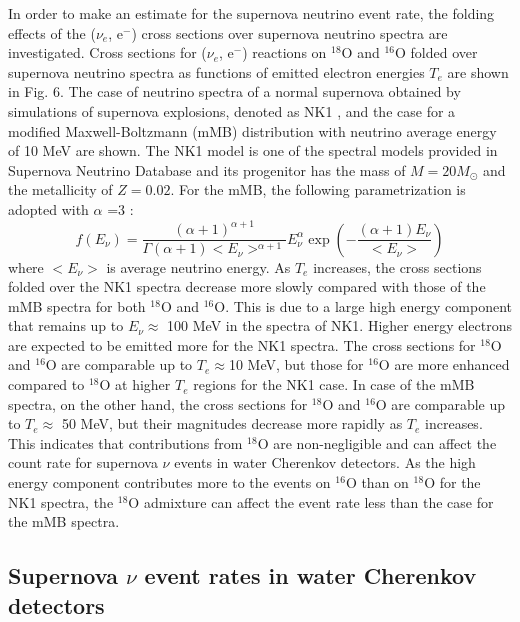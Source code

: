 \documentclass[preprint,12pt]{elsarticle}
\begin{document}
In order to make an estimate for the supernova neutrino event rate, the folding effects of the ($\nu_e$, e$^{-}$) cross sections over supernova neutrino spectra are investigated. 
Cross sections for ($\nu_e$, e$^{-}$) reactions on $^{18}$O and $^{16}$O folded over supernova neutrino spectra as functions of emitted electron energies $T_e$ are shown in Fig. 6. 
The case of neutrino spectra of a normal supernova obtained by simulations of supernova explosions, denoted as NK1 \cite{PTEP2022,Nakazato2018}, and 
the case for a modified Maxwell-Boltzmann (mMB) distribution with neutrino average energy of 10 MeV are shown.
The NK1 model is one of the spectral models provided in Supernova Neutrino Database \cite{Naka2013} and its progenitor has the mass of $M=20M_\odot$ and the metallicity of $Z=0.02$.
For the mMB, the following parametrization is adopted with $\alpha$ =3 \cite{KRJ}:
\begin{equation}
f(E_{\nu}) = \frac{(\alpha +1)^{\alpha +1}}{\Gamma(\alpha +1) <E_{\nu}>^{\alpha +1}} E_{\nu}^{\alpha} \exp( -\frac{(\alpha +1)E_{\nu}}{<E_{\nu}>})
\end{equation}
where $<E_{\nu}>$ is average neutrino energy.
As $T_e$ increases, the cross sections folded over the NK1 spectra decrease more slowly compared with those of the mMB spectra for both $^{18}$O and $^{16}$O.
This is due to a large high energy component that remains up to $E_{\nu}\approx$ 100 MeV in the spectra of NK1.
Higher energy electrons are expected to be emitted more for the NK1 spectra.  
The cross sections for $^{18}$O and $^{16}$O are comparable up to $T_e\approx$10 MeV, but those for $^{16}$O are more enhanced compared to $^{18}$O at higher $T_e$ regions for the NK1 case.
In case of the mMB spectra, on the other hand, the cross sections for $^{18}$O and $^{16}$O are comparable up to $T_e\approx$ 50 MeV, but their magnitudes decrease more rapidly as $T_e$ increases.   
This indicates that contributions from $^{18}$O are non-negligible 
and can affect the count rate for supernova $\nu$ events in water Cherenkov detectors.
As the high energy component contributes more to the events on $^{16}$O than on $^{18}$O for the NK1 spectra, the $^{18}$O admixture can affect the event rate less than the case for the mMB spectra.   


\subsection{Supernova $\nu$ event rates in water Cherenkov detectors}
\end{document}
